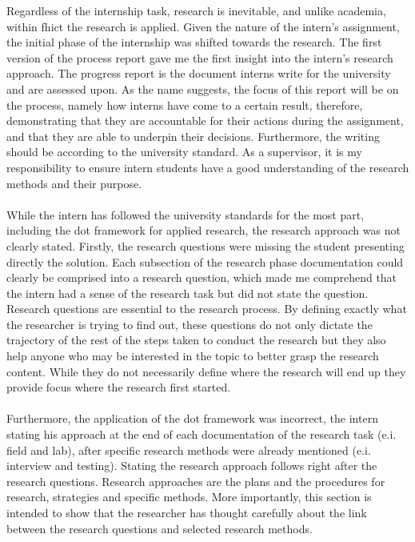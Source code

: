 Regardless of the internship task, research is inevitable, and unlike academia, within \acrshort{fhict} the research is applied. 
Given the nature of the intern's assignment, the initial phase of the internship was shifted towards the research. 
The first version of the process report gave me the first insight into the intern's research approach. 
The progress report is the document interns write for the university and are assessed upon.
As the name suggests, the focus of this report will be on the process, namely how interns have come to a certain result, therefore, demonstrating that they are accountable for their actions during the assignment, and that they are able to underpin their decisions. 
Furthermore, the writing should be according to the university standard.
As a supervisor, it is my responsibility to ensure intern students have a good understanding of the research methods and their purpose. \\\\
While the intern has followed the university standards for the most part, including the \acrshort{dot} framework for applied research, the research approach was not clearly stated. 
Firstly, the research questions were missing the student presenting directly the solution. 
Each subsection of the research phase documentation could clearly be comprised into a research question, which made me comprehend that the intern had a sense of the research task but did not state the question. 
Research questions are essential to the research process. 
By defining exactly what the researcher is trying to find out,  these questions do not only dictate the trajectory of the rest of the steps taken to conduct the research but they also help anyone who may be interested in the topic to better grasp the research content. 
While they do not necessarily define where the research will end up they provide focus where the research first started.\\\\
Furthermore, the application of the \acrshort{dot} framework was incorrect, the intern stating his approach at the end of each documentation of the research task (e.i. field and lab), after specific research methods were already mentioned (e.i. interview and testing).
Stating the research approach follows right after the research questions. 
Research approaches are the plans and the procedures for research, strategies and specific methods. 
More importantly, this section is intended to show that the researcher has thought carefully about the link between the research questions and selected research methods.\\\\

